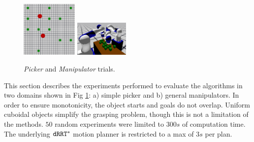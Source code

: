 %

\begin{figure}[h]
	\centering
		\includegraphics[width=0.245\textwidth,trim={1cm 9cm 1cm 5cm},clip]{figures/simple_picker_benchmark}
		\includegraphics[width=0.235\textwidth]{figures/kuka_benchmark2}
		\caption{\textit{Picker} and \textit{Manipulator} trials.}
		\label{fig:benchmarks}
\end{figure}
This section describes the experiments performed to evaluate the algorithms in two  domains shown in Fig \ref{fig:benchmarks}: a) simple picker and b) general manipulators.
In order to ensure monotonicity, the object starts and goals do not overlap. Uniform cuboidal objects simplify the grasping problem, though this is not a limitation of the methods. $ 50 $ random experiments were limited to $300s$ of computation time. The underlying $ {\tt dRRT^*} $ motion planner is restricted to a max of $ 3s $ per plan.
